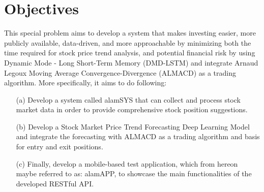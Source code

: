 \section{Objectives}
\label{sec:objectives}
This special problem aims to develop a system that makes investing easier, 
more publicly available, data-driven, and more approachable by minimizing both the 
time required for stock price trend analysis, and potential financial risk 
by using Dynamic Mode - Long Short-Term Memory (DMD-LSTM) and integrate 
Arnaud Legoux Moving Average Convergence-Divergence (ALMACD) as a trading algorithm. 
More specifically, it aims to do following:
\begin{itemize}
  \item[(a)] Develop a system called alamSYS that can collect and process stock market data in order 
  to provide comprehensive stock position suggestions.
  \item[(b)] Develop a Stock Market Price Trend Forecasting 
  Deep Learning Model and integrate the forecasting with ALMACD as
  a trading algorithm and basis for entry and exit positions.
  \item[(c)] Finally, develop a mobile-based test application, which from hereon maybe referred to 
  as: alamAPP, to showcase the main functionalities of the developed RESTful API.
\end{itemize}